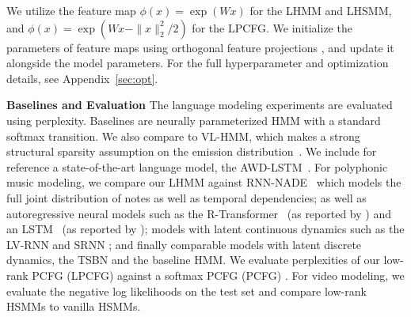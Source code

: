 \documentclass{article}
\begin{document}
We utilize the feature map $\phi(x) = \exp(Wx)$ for the LHMM and LHSMM, and $\phi(x) = \exp(Wx - \|x\|_2^2/2)$ for the LPCFG. We initialize the parameters of feature maps using orthogonal feature projections \citep{choromanski2020performer}, and update it alongside the model parameters.
For the full hyperparameter and optimization details, see Appendix~\ref{sec:opt}.

\textbf{Baselines and Evaluation}
The language modeling experiments are evaluated using perplexity. Baselines are neurally parameterized HMM
with a standard softmax transition.  We also compare to VL-HMM, which makes a strong structural sparsity assumption on the emission distribution~\citep{chiu2020scaling}. We include for reference a state-of-the-art language model, the AWD-LSTM~\citep{merity2017awdlstm}. For polyphonic music modeling, we compare our LHMM against RNN-NADE~\citep{polyphonic} which models the full joint distribution of notes as well as temporal dependencies; as well as autoregressive neural models such as the R-Transformer~\citep{rtransformer} (as reported by \citet{betalstm}) and an LSTM ~(as reported by \citet{flow}); models with latent continuous dynamics such as the LV-RNN \citep{nasmc} and SRNN \citep{srnn}; and finally comparable models with latent discrete dynamics, the TSBN \citep{tsbn} and the baseline HMM.
We evaluate perplexities of our low-rank PCFG (LPCFG) against a softmax PCFG (PCFG) \citep{kim2019cpcfg}. For video modeling, we evaluate the negative log likelihoods on the test set and compare low-rank HSMMs to vanilla HSMMs.
\end{document}
